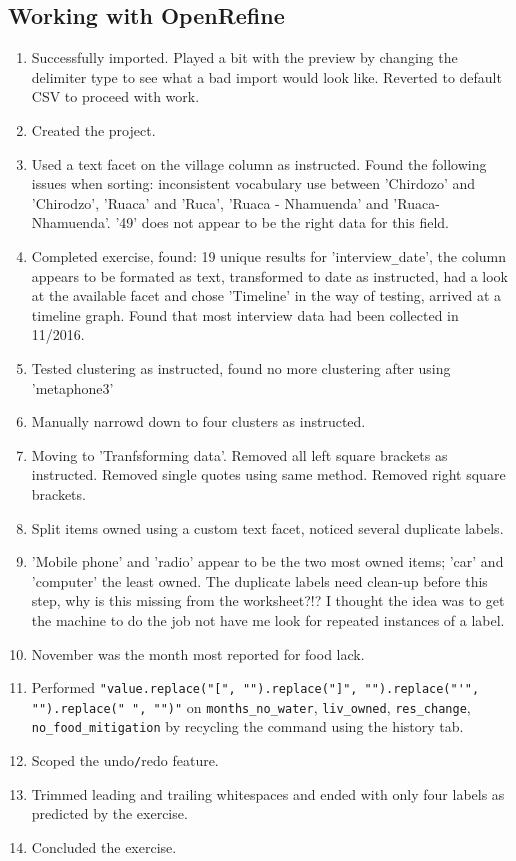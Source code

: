 \documentclass{article}
\begin{document}
\subsection{Working with OpenRefine}
\begin{enumerate}
    \item Successfully imported. Played a bit with the preview by changing the delimiter type to see what a bad import would look like. Reverted to default CSV to proceed with work.
    \item Created the project.
    \item Used a text facet on the village column as instructed. Found the following issues when sorting: inconsistent vocabulary use between 'Chirdozo' and 'Chirodzo', 'Ruaca' and 'Ruca', 'Ruaca - Nhamuenda' and 'Ruaca-Nhamuenda'. '49' does not appear to be the right data for this field.
    \item Completed exercise, found: 19 unique results for 'interview\verb|_|date', the column appears to be formated as text, transformed to date as instructed, had a look at the available facet and chose 'Timeline' in the way of testing, arrived at a timeline graph. Found that most interview data had been collected in 11/2016.
    \item Tested clustering as instructed, found no more clustering after using 'metaphone3'
    \item Manually narrowd down to four clusters as instructed.
    \item Moving to 'Tranfsforming data'. Removed all left square brackets as instructed. Removed single quotes using same method. Removed right square brackets.
    \item Split items owned using a custom text facet, noticed several duplicate labels.
    \item 'Mobile phone' and 'radio' appear to be the two most owned items; 'car' and 'computer' the least owned. The duplicate labels need clean-up before this step, why is this missing from the worksheet?!? I thought the idea was to get the machine to do the job not have me look for repeated instances of a label.
    \item November was the month most reported for food lack.
    \item Performed \newline \verb|"value.replace("[", "").replace("]", "").replace("'", "").replace(" ", "")"| on \verb|months_no_water|, \verb|liv_owned|, \verb|res_change|, \verb|no_food_mitigation| by recycling the command using the history tab.
    \item Scoped the undo\verb|/|redo feature.
    \item Trimmed leading and trailing whitespaces and ended with only four labels as predicted by the exercise.
    \item Concluded the exercise.
\end{enumerate}
\end{document}
